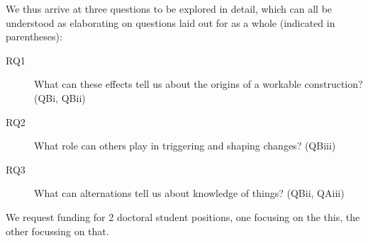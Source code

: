 
\notocsubsection{\pipl}

\begin{giprenv}
  
\end{giprenv}
\gicolsep
\begin{giprenv}
  
\end{giprenv}

\notocsubsection{\prsum}


\notocsubsubsection{\resqu}%

\blindtext

We thus
arrive at three questions to be explored in detail, which can all be
understood as elaborating on questions laid out for \thiscrc{} as a
whole (indicated in parentheses):

\begin{description}
\item[RQ1] What can these effects tell us about the origins
  of a workable construction? (QBi, QBii)
\item[RQ2] What role can others play in triggering and shaping
  changes? (QBiii)
\item[RQ3] What can alternations tell us
  about knowledge of things? (QBii, QAiii)
\end{description}

\notocsubsubsection{\statepl}


\blindtext

\notocsubsubsection{\respr}

\blindtext


\notocsubsection{\funds}

We request funding for 2 doctoral student positions, one focusing on the
this, the other focussing on that.
